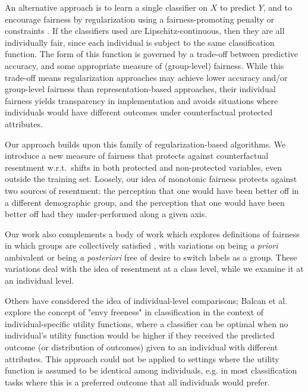     An alternative approach is to learn a single classifier on $X$ to predict $Y$, and to encourage fairness by regularization using a fairness-promoting penalty \citep{KamAkaSak2011,KamAkHidSak2012,berk2017convex} or constraints \citep{zafar2017parity,zafar2017aistats,AgaBeyDudLanWal2018}. If the classifiers used are Lipschitz-continuous, then they are all individually fair, since each individual is subject to the same classification function. The form of this function is governed by a trade-off between predictive accuracy, and some appropriate measure of (group-level) fairness. While this trade-off means regularization approaches may achieve lower accuracy and/or group-level fairness than representation-based approaches, their individual fairness yields transparency in implementation and avoids situations where individuals would have different outcomes under counterfactual protected attributes.

    Our approach builds upon this family of regularization-based algorithms. We introduce a new measure of fairness that protects against counterfactual resentment w.r.t.\ shifts in both protected and non-protected variables, even outside the training set. Loosely, our idea of monotonic fairness protects against two sources of resentment: the perception that one would have been better off in a different demographic group, and the perception that one would have been better off had they under-performed along a given axis.

    Our work also complements a body of work which explores definitions of fairness in which groups are collectively satisfied \cite{zafar2017parity,heidari2018}, with variations on being \textit{a priori} ambivalent or being \textit{a posteriori} free of desire to switch labels as a group.  These variations deal with the idea of resentment at a class level, while we examine it at an individual level.  
    
    Others have considered the idea of individual-level comparisons; Balcan et al.\ \cite{balcan2018} explore the concept of "envy freeness" in classification in the context of individual-specific utility functions, where a classifier can be optimal when no individual's utility function would be higher if they received the predicted outcome (or distribution of outcomes) given to an individual with different attributes. This approach could not be applied to settings where the utility function is assumed to be identical among individuals, e.g. in most classification tasks where this is a preferred outcome that all individuals would prefer.
    
